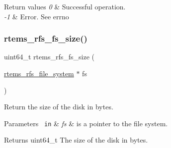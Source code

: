 \begin{DoxyRetVals}{Return values}
{\em 0} & Successful operation. \\
\hline
{\em -\/1} & Error. See errno \\
\hline
\end{DoxyRetVals}
\mbox{\label{rtems-rfs-file-system_8h_a0c8274793080a83d483e966475ccc2a5}} 
\subsubsection{\texorpdfstring{rtems\_rfs\_fs\_size()}{rtems\_rfs\_fs\_size()}}
{\footnotesize\ttfamily uint64\+\_\+t rtems\+\_\+rfs\+\_\+fs\+\_\+size (\begin{DoxyParamCaption}\item[{\mbox{\hyperlink{struct__rtems__rfs__file__system}{rtems\+\_\+rfs\+\_\+file\+\_\+system}} $\ast$}]{fs }\end{DoxyParamCaption})}

Return the size of the disk in bytes.


\begin{DoxyParams}[1]{Parameters}
\mbox{\texttt{ in}}  & {\em fs} & is a pointer to the file system. \\
\hline
\end{DoxyParams}
\begin{DoxyReturn}{Returns}
uint64\+\_\+t The size of the disk in bytes. 
\end{DoxyReturn}
